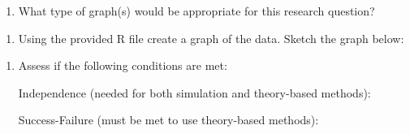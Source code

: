 \documentclass[
]{report}
\providecommand{\tightlist}{%
  \setlength{\itemsep}{0pt}\setlength{\parskip}{0pt}}
\begin{document}
\vspace{0.5in}

\begin{enumerate}
\def\labelenumi{\alph{enumi}.}
\setcounter{enumi}{6}
\tightlist
\item
  What type of graph(s) would be appropriate for this research question?
\end{enumerate}

\vspace{0.3in}

\begin{enumerate}
\def\labelenumi{\alph{enumi}.}
\setcounter{enumi}{7}
\tightlist
\item
  Using the provided R file create a graph of the data. Sketch the graph below:
\end{enumerate}

\vspace{2in}

\begin{enumerate}
\def\labelenumi{\roman{enumi}.}
\item
  Assess if the following conditions are met:

  Independence (needed for both simulation and theory-based methods):
  \vspace{0.5in}

  Success-Failure (must be met to use theory-based methods):
  \vspace{0.6in}
\end{enumerate}
\end{document}
